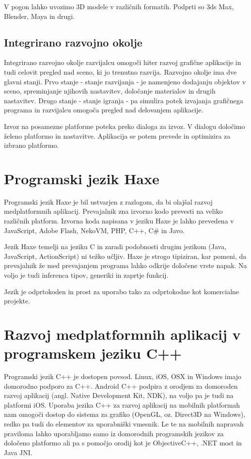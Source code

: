 V pogon lahko uvozimo 3D modele v različnih formatih. Podprti so 3ds Max, Blender, Maya in drugi. 

\subsection{Integrirano razvojno okolje} 

Integrirano razvojno okolje razvijalcu omogoči hiter razvoj grafične aplikacije in tudi celovit pregled nad sceno, ki jo trenutno razvija. Razvojno okolje ima dve glavni stanji. Prvo stanje - stanje razvijanja - je namenjeno dodajanju objektov v sceno, spreminjanje njihovih nastavitev, določanje materialov in drugih nastavitev. Drugo stanje - stanje igranja - pa simulira potek izvajanja grafičnega programa in razvijalcu omogoča pregled nad delovanjem aplikacije. 

Izvoz na posamezne platforme poteka preko dialoga za izvoz. V dialogu določimo želeno platformo in nastavitve. Aplikacija se potem prevede in optimizira za izbrano platformo.


\section{Programski jezik Haxe}
\label{sec:haxe}

Programski jezik Haxe \cite{haxe} je bil ustvarjen z razlogom, da bi olajšal razvoj medplatformnih aplikacij. Prevajalnik zna izvorno kodo prevesti na veliko različnih platform. Izvorna koda napisana v jeziku Haxe je lahko prevedena v JavaScript, Adobe Flash, NekoVM, PHP, C++, C\# in Javo.

Jezik Haxe temelji na jeziku C in zaradi podobnosti drugim jezikom (Java, JavaScript, ActionScript) ni težko učljiv. Haxe je strogo tipiziran, kar pomeni, da prevajalnik že med prevajanjem programa lahko odkrije določene vrste napak. Na voljo je tudi inferenca tipov, generiki in zaprtje funkcij. 

Jezik je odprtokoden in prost za uporabo tako za odprtokodne kot komercialne projekte.

\section{Razvoj medplatformnih aplikacij v programskem jeziku C++}
\label{sec:cpp}
Programski jezik C++ je dostopen povsod. Linux, iOS, OSX in Windows imajo domorodno podporo za C++. Android C++ podpira z orodjem za domoroden razvoj aplikacij (angl. Native Development Kit, NDK), na voljo pa je tudi na platformi iOS. Uporaba jezika C++ za razvoj aplikacij na mobilnih platformah nam omogoči dostop do sistema za grafiko (OpenGL, oz. Direct3D na Windows), redko pa tudi do elementov za uporabniški vmesnik. Le te na mobilnih napravah praviloma lahko uporabljamo samo iz domorodnih programskih jezikov za določeno platformo ali pa s pomočjo orodij kot je ObjectiveC++, .NET most in Java JNI.


